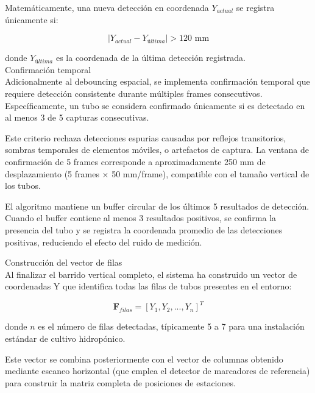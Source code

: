 Matemáticamente, una nueva detección en coordenada $Y_{actual}$ se registra únicamente si:

\begin{equation}
|Y_{actual} - Y_{última}| > 120 \text{ mm}
\end{equation}

donde $Y_{última}$ es la coordenada de la última detección registrada.\\

Confirmación temporal\\
\noindent
Adicionalmente al debouncing espacial, se implementa confirmación temporal que requiere detección consistente durante múltiples frames consecutivos. Específicamente, un tubo se considera confirmado únicamente si es detectado en al menos 3 de 5 capturas consecutivas.

Este criterio rechaza detecciones espurias causadas por reflejos transitorios, sombras temporales de elementos móviles, o artefactos de captura. La ventana de confirmación de 5 frames corresponde a aproximadamente 250 mm de desplazamiento (5 frames × 50 mm/frame), compatible con el tamaño vertical de los tubos.

El algoritmo mantiene un buffer circular de los últimos 5 resultados de detección. Cuando el buffer contiene al menos 3 resultados positivos, se confirma la presencia del tubo y se registra la coordenada promedio de las detecciones positivas, reduciendo el efecto del ruido de medición.

Construcción del vector de filas\\
\noindent
Al finalizar el barrido vertical completo, el sistema ha construido un vector de coordenadas Y que identifica todas las filas de tubos presentes en el entorno:

\begin{equation}
\mathbf{F}_{filas} = [Y_1, Y_2, ..., Y_n]^T
\end{equation}

donde $n$ es el número de filas detectadas, típicamente 5 a 7 para una instalación estándar de cultivo hidropónico.

Este vector se combina posteriormente con el vector de columnas obtenido mediante escaneo horizontal (que emplea el detector de marcadores de referencia) para construir la matriz completa de posiciones de estaciones.